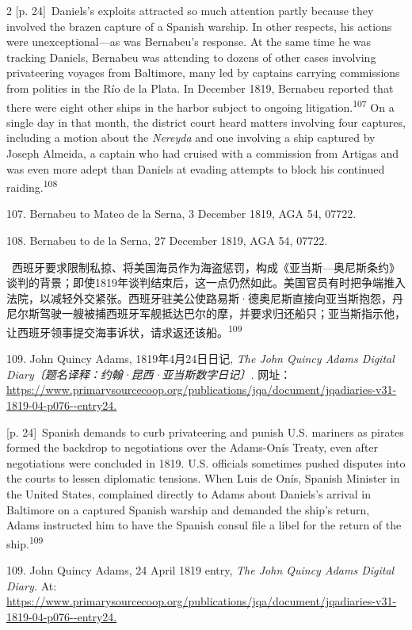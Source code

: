 \documentclass[10pt,a4paper]{article}
\begin{document}
\begin{paracol}{2}
\switchcolumn
{\scriptsize\color{gray} [p. 24]}\ Daniels’s exploits attracted so much attention partly because they involved the brazen capture of a Spanish warship. In other respects, his actions were unexceptional—as was Bernabeu’s response. At the same time he was tracking Daniels, Bernabeu was attending to dozens of other cases involving privateering voyages from Baltimore, many led by captains carrying commissions from polities in the Río de la Plata. In December 1819, Bernabeu reported that there were eight other ships in the harbor subject to ongoing litigation.\nobreak\textsuperscript{107} On a single day in that month, the district court heard matters involving four captures, including a motion about the \textit{Nereyda} and one involving a ship captured by Joseph Almeida, a captain who had cruised with a commission from Artigas and was even more adept than Daniels at evading attempts to block his continued raiding.\nobreak\textsuperscript{108}\par{\small 107. Bernabeu to Mateo de la Serna, 3 December 1819, AGA 54, 07722.\par}{\small 108. Bernabeu to de la Serna, 27 December 1819, AGA 54, 07722.\par}
\switchcolumn*
{\scriptsize\color{gray} [p. 24]}\ 西班牙要求限制私掠、将美国海员作为海盗惩罚，构成《亚当斯—奥尼斯条约》谈判的背景；即使1819年谈判结束后，这一点仍然如此。美国官员有时把争端推入法院，以减轻外交紧张。西班牙驻美公使路易斯·德奥尼斯直接向亚当斯抱怨，丹尼尔斯驾驶一艘被捕西班牙军舰抵达巴尔的摩，并要求归还船只；亚当斯指示他，让西班牙领事提交海事诉状，请求返还该\mbox{船。\textsuperscript{109}}\par{\small 109. John Quincy Adams, 1819年4月24日日记, \textit{The John Quincy Adams Digital Diary〔题名译释：约翰·昆西·亚当斯数字日记〕.} 网址： \url{https://www.primarysourcecoop.org/publications/jqa/document/jqadiaries-v31-1819-04-p076--entry24.}\par}
\switchcolumn
{\scriptsize\color{gray} [p. 24]}\ Spanish demands to curb privateering and punish U.S. mariners as pirates formed the backdrop to negotiations over the Adams-Onís Treaty, even after negotiations were concluded in 1819. U.S. officials sometimes pushed disputes into the courts to lessen diplomatic tensions. When Luis de Onís, Spanish Minister in the United States, complained directly to Adams about Daniels’s arrival in Baltimore on a captured Spanish warship and demanded the ship’s return, Adams instructed him to have the Spanish consul file a libel for the return of the ship.\nobreak\textsuperscript{109}\par{\small 109. John Quincy Adams, 24 April 1819 entry, \textit{The John Quincy Adams Digital Diary.} At: \url{https://www.primarysourcecoop.org/publications/jqa/document/jqadiaries-v31-1819-04-p076--entry24.}\par}

\end{paracol}
\end{document}
